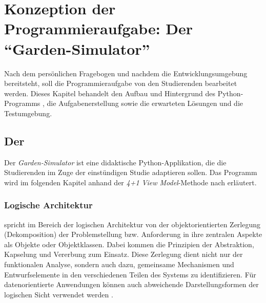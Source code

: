 \section{Konzeption der Programmieraufgabe: Der \enquote{Garden-Simulator}}

Nach dem persönlichen Fragebogen und nachdem die Entwicklungsumgebung bereitsteht, soll die Programmieraufgabe von den Studierenden bearbeitet werden. Dieses Kapitel behandelt den Aufbau und Hintergrund des Python-Programms , die Aufgabenerstellung sowie die erwarteten Lösungen und die Testumgebung.

\subsection{Der }
Der \textit{Garden-Simulator} ist eine didaktische Python-Applikation, die die Studierenden im Zuge der einstündigen Studie adaptieren sollen. Das Programm wird im folgenden Kapitel anhand der \textit{4+1 View Model}-Methode nach \textcite{kruchten_41_1995} erläutert.

\subsubsection{Logische Architektur}\label{cha:logische-architektur}
\textcite[S.~3]{kruchten_41_1995} spricht im Bereich der logischen Architektur von der objektorientierten Zerlegung (Dekomposition) der Problemstellung bzw. Anforderung in ihre zentralen Aspekte als Objekte oder Objektklassen. Dabei kommen die Prinzipien der Abstraktion, Kapselung und Vererbung zum Einsatz. Diese Zerlegung dient nicht nur der funktionalen Analyse, sondern auch dazu, gemeinsame Mechanismen und Entwurfselemente in den verschiedenen Teilen des Systems zu identifizieren. Für datenorientierte Anwendungen können auch abweichende Darstellungsformen der logischen Sicht verwendet werden \parencite[S.~3]{kruchten_41_1995}.

